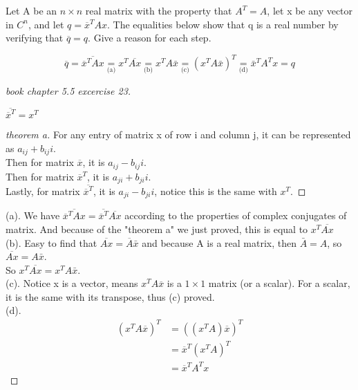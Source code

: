 \begin{problem}
    Let A be an \(n \times n\) real matrix with the property that \(A^T = A\), let x be any vector in \(C^n\), and let \(q = \overline{x}^T A x\). 
    The equalities below show that q is a real number by verifying that \(\overline{q} = q\). 
    Give a reason for each step.   

    
    \[
        \overline{q} = \overline{\overline{x}^T A x} 
                \underset{\text{(a)}}{=} 
                        x^T \overline{A x}
                \underset{\text{(b)}}{=} 
                        x^T A \bar{x} 
                \underset{\text{(c)}}{=} 
                        (x^T A \bar{x})^T 
                \underset{\text{(d)}}{=} 
                \bar{x}^T A^T x = q
    \]
\end{problem}
\begin{proof}[book chapter 5.5 excercise 23]
    \begin{theorem}[theorem a]
        \(\overline{\overline{x}^T} = x^T\)     
    \end{theorem}
    \begin{proof}[theorem a]
        For any entry of matrix x of row i and column j, it can be represented as \(a_{ij} + b_{ij}i\). \\
        Then for matrix \(\overline{x}\), it is \(a_{ij} - b_{ij}i\). \\
        Then for matrix \(\overline{x}^T\), it is \(a_{ji} + b_{ji} i\). \\  
        Lastly, for matrix \(\overline{\overline{x}^T}\), it is \(a_{ji} - b_{ji}i\), notice this is the same with \(x^T\).   
    \end{proof}
    (a). We have \(\overline{\overline{x}^T A x}  = \overline{\overline{x}^T} \overline{Ax}\) according to the properties of complex conjugates of matrix.
    And because of the "theorem a" we just proved, this is equal to \(x^T \overline{Ax}\) \\
    (b). Easy to find that \(\overline{Ax} = \overline{A} \bar{x}\) and because A is a real matrix, then \(\bar{A} = A\), so \(\overline{Ax} = A\bar{x}\).\\
    So \(x^T \overline{Ax} = x^T A \bar{x}\). \\  
    (c). Notice x is a vector, means \(x^T A \overline{x}\) is a \(1 \times 1\) matrix (or a scalar). For a scalar, it is the same with its transpose, thus (c) proved. \\
    (d). 
    \begin{align*}
        (x^T A \overline{x})^T &= ((x^T A) \overline{x})^T \\  
            &= \overline{x}^T (x^T A)^T \\
            &= \overline{x}^T A^T x
    \end{align*}
\end{proof}

